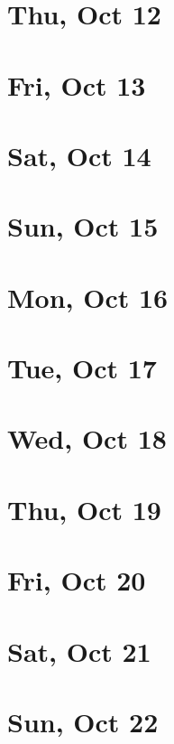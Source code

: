	\section{Thu, Oct 12}
		
	\section{Fri, Oct 13}
		
	\section{Sat, Oct 14}
		
	\section{Sun, Oct 15}
		
	\section{Mon, Oct 16}
		
	\section{Tue, Oct 17}
		
	\section{Wed, Oct 18}
		
	\section{Thu, Oct 19}
		
	\section{Fri, Oct 20}
		
	\section{Sat, Oct 21}
		
	\section{Sun, Oct 22}
		

